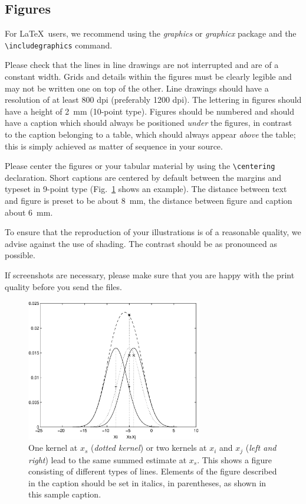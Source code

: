 \documentclass[runningheads,a4paper]{llncs}
\begin{document}
{\subsection{Figures}

For \LaTeX\ users, we recommend using the \emph{graphics} or \emph{graphicx}
package and the \verb+\includegraphics+ command.

Please check that the lines in line drawings are not
interrupted and are of a constant width. Grids and details within the
figures must be clearly legible and may not be written one on top of
the other. Line drawings should have a resolution of at least 800 dpi
(preferably 1200 dpi). The lettering in figures should have a height of
2~mm (10-point type). Figures should be numbered and should have a
caption which should always be positioned \emph{under} the figures, in
contrast to the caption belonging to a table, which should always appear
\emph{above} the table; this is simply achieved as matter of sequence in
your source.

Please center the figures or your tabular material by using the \verb+\centering+
declaration. Short captions are centered by default between the margins
and typeset in 9-point type (Fig.~\ref{fig:example} shows an example).
The distance between text and figure is preset to be about 8~mm, the
distance between figure and caption about 6~mm.

To ensure that the reproduction of your illustrations is of a reasonable
quality, we advise against the use of shading. The contrast should be as
pronounced as possible.

If screenshots are necessary, please make sure that you are happy with
the print quality before you send the files.
\begin{figure}
\centering
\includegraphics[height=6.2cm]{eijkel2}
\caption{One kernel at $x_s$ (\emph{dotted kernel}) or two kernels at
$x_i$ and $x_j$ (\textit{left and right}) lead to the same summed estimate
at $x_s$. This shows a figure consisting of different types of
lines. Elements of the figure described in the caption should be set in
italics, in parentheses, as shown in this sample caption.}
\label{fig:example}
\end{figure}

}
\end{document}
